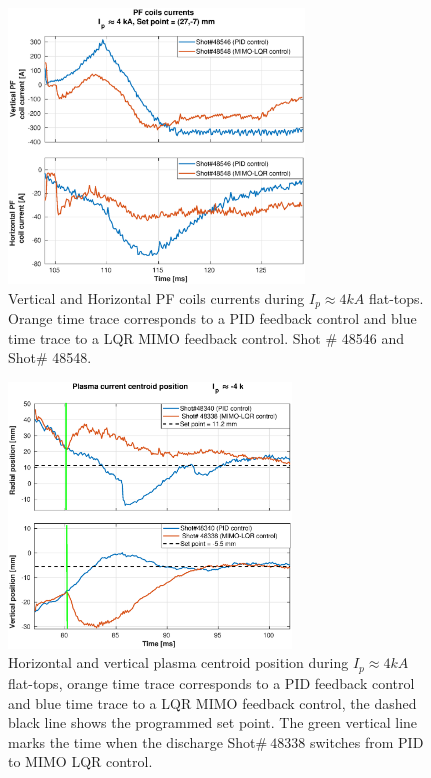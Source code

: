 \begin{figure}
	\centering
	\includegraphics[width=0.7\textwidth]{Chp5/PIDvsMIMO_546_548_curr_2.eps}
	\caption{ Vertical and Horizontal PF coils currents during  $I_p\approx 4kA$  flat-tops. Orange time trace corresponds to a PID feedback control and blue time trace to a LQR MIMO feedback control.  Shot $\#$ 48546 and Shot$\#$ 48548.}
\end{figure}

\begin{figure}
	\centering
	\includegraphics[width=0.67\textwidth]{Chp5/PIDvsMIMO_340_338_2.eps}
	\caption{Horizontal and vertical plasma centroid position during  $I_p\approx 4kA$  flat-tops, orange time trace corresponds to a PID feedback control and blue time trace to a LQR MIMO feedback control, the dashed black line shows the programmed set point. The green vertical line marks the time  when the  discharge Shot$\# ~48338$ switches  from PID to MIMO LQR control.	}
\end{figure}

